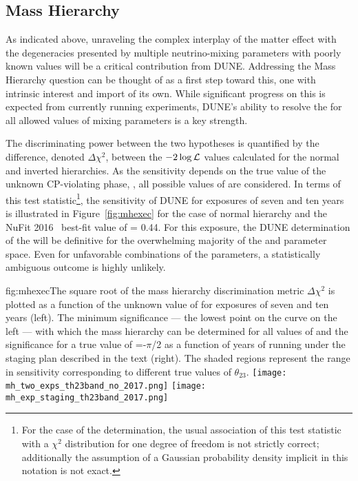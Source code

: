 \subsection{Mass Hierarchy}
\label{sec:exec-summ-physics-mh-cpv}

As indicated above, unraveling the complex interplay of the matter effect with the degeneracies presented by multiple neutrino-mixing parameters with poorly known values will be a critical contribution from DUNE. Addressing the Mass Hierarchy question can be thought of as a first step toward this, one with intrinsic interest and import of its own.  While significant progress on this is expected from currently running experiments, DUNE's ability to resolve the  for all allowed values of mixing parameters is a key strength.

The discriminating power between the two  hypotheses is quantified
by the difference, denoted $\Delta \chi^2$, between the
$-2\log{\cal L}$ values calculated for the normal and inverted
hierarchies. As the sensitivity depends on the true value of the unknown
CP-violating phase, \deltacp, all possible values of \deltacp are
considered.  In terms of this test statistic\footnote{For the case of the  determination, the usual
  association of this test statistic with a $\chi^2$ distribution for
  one degree of freedom is not strictly correct; additionally the assumption of a
  Gaussian probability density 
  implicit in this notation is not exact.}, the 
sensitivity of DUNE for exposures of seven and ten years is
illustrated in Figure~\ref{fig:mhexec} for the case of normal
hierarchy and the NuFit 2016~\cite{nufit2016} best-fit value of  = 0.44. 
For this exposure, the DUNE determination of the  will be definitive for
the overwhelming majority of the  \deltacp and  parameter space.
Even for unfavorable combinations of the parameters, a statistically
ambiguous outcome is highly unlikely.  
\begin{dunefigure}{fig:mhexec}{The
    square root of the mass hierarchy discrimination metric $\Delta
    \chi^2$ is plotted as a function of the unknown value of \deltacp
    for exposures of seven and ten years  
    (left).  The minimum significance
    --- the lowest point on the curve on the left --- with which the mass
    hierarchy can be determined for all values of \deltacp and the significance for a true value of \deltacp=-$\pi$/2 as a
    function of years of running under the staging plan described in the text (right).
    The shaded regions represent the range in sensitivity corresponding to
    different true values of $\theta_{23}$.}
\texttt{[image: mh\_two\_exps\_th23band\_no\_2017.png]}
\texttt{[image: mh\_exp\_staging\_th23band\_2017.png]}
\end{dunefigure}


